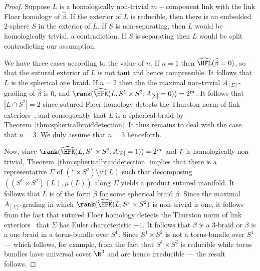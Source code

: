 \documentclass{amsart}
\theoremstyle{definition}
\theoremstyle{remark}
\numberwithin{equation}{section}
\begin{document}
\begin{proof}
Suppose $L$ is a homologically non-trivial $m-$component link with the link Floer homology of $\widehat{\beta}$. If the exterior of $L$ is reducible, then there is an embedded $2$-sphere $S$ in the exterior of $L$. If $S$ is non-separating, then    $L$ would be homologically trivial, a contradiction. If $S$ is separating then $L$ would be split contradicting our assumption.

We have three cases according to the value of $n$. If $n=1$ then $\widehat{\HFL}(\widehat{\beta}=0)$, so that the sutured exterior of $L$ is not taut and hence compressible. It follows that $L$ is the spherical one braid. If $n=2$ then the the maximal non-trivial $A_{[\Sigma]}$-grading of $\widehat{\beta}$ is $0$, and $\rank(\widehat{\HFK}(L,S^1\times S^2;A_{[\Sigma]}=0))=2^m$. It follows that $|L\cap S^2|=2$ since sutured Floer homology detects the Thurston norm of link exteriors~\cite[Proposition 7.7]{friedl2011decategorification}, and consequently that $L$ is a spherical braid by Theorem~\ref{thm:sphericalbraiddetection}. It thus remains to deal with the case that $n=3$. We duly assume that $n=3$ henceforth.
    
    Now, since $\rank(\widehat{\HFK}(L,S^1\times S^2;A_{[\Sigma]}=1))=2^{{m}}$ and $L$ is homologically non-trivial, Theorem~\ref{thm:sphericalbraiddetection} implies that there is a representative $\Sigma$ of $(*\times S^2)\setminus \nu(L)$ such that decomposing $((S^1\times S^2)(L),\mu(L))$ along $\Sigma$ yields a product sutured manifold. It follows that $L$ is of the form $\widehat{\beta}$ for some spherical braid $\beta$. Since the maximal $A_{[\Sigma]}$-grading in which $\rank(\widehat{\HFK}(L,S^1\times S^2)$ is non-trivial is one, it follows from the fact that sutured Floer homology detects the Thurston norm of link exteriors~\cite[Proposition 7.7]{friedl2011decategorification} that $\Sigma$ has Euler characteristic $-1$. It follows that $\beta$ is a $3$-braid or $\beta$ is a one braid in a torus-bundle over $S^1$. Since $S^1\times S^2$ is not a torus-bundle over $S^1$  --- which follows, for example, from the fact that $S^1\times S^2$ is reducible while torus bundles have universal cover $\R^3$ and are hence irreducible --- the result follows.\end{proof}
    



\end{document}
